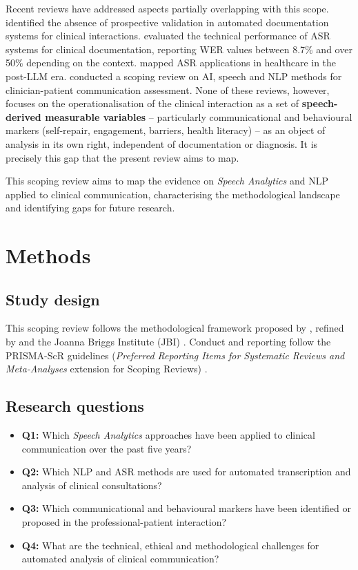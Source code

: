 \documentclass[review,12pt]{elsarticle}
\begin{document}
Recent reviews have addressed aspects partially overlapping with this scope.
\citet{Falcetta2023} identified the absence of prospective validation in
automated documentation systems for clinical interactions. \citet{Ng2025}
evaluated the technical performance of ASR systems for clinical documentation,
reporting WER values between 8.7\% and over 50\% depending on the context.
\citet{Alabbad2026} mapped ASR applications in healthcare in the post-LLM
era. \citet{Albert2024} conducted a scoping review on AI, speech and NLP
methods for clinician-patient communication assessment. None of these reviews,
however, focuses on the operationalisation of the clinical interaction as a
set of \textbf{speech-derived measurable variables} -- particularly
communicational and behavioural markers (self-repair, engagement, barriers,
health literacy) -- as an object of analysis in its own right, independent of
documentation or diagnosis. It is precisely this gap that the present review
aims to map.

This scoping review aims to map the evidence on \textit{Speech Analytics}
and NLP applied to clinical communication, characterising the methodological
landscape and identifying gaps for future research.

\section{Methods}
\label{sec:metodos}

\subsection{Study design}

This scoping review follows the methodological framework proposed by
\citet{Arksey2005}, refined by \citet{Levac2010} and the Joanna Briggs
Institute (JBI) \citep{Peters2020}. Conduct and reporting follow the
PRISMA-ScR guidelines (\textit{Preferred Reporting Items for Systematic
Reviews and Meta-Analyses} extension for Scoping Reviews) \citep{Tricco2018}.

\subsection{Research questions}

\begin{itemize}
  \item \textbf{Q1:} Which \textit{Speech Analytics} approaches have been
        applied to clinical communication over the past five years?
  \item \textbf{Q2:} Which NLP and ASR methods are used for automated
        transcription and analysis of clinical consultations?
  \item \textbf{Q3:} Which communicational and behavioural markers have been
        identified or proposed in the professional-patient interaction?
  \item \textbf{Q4:} What are the technical, ethical and methodological
        challenges for automated analysis of clinical communication?
\end{itemize}
\end{document}
